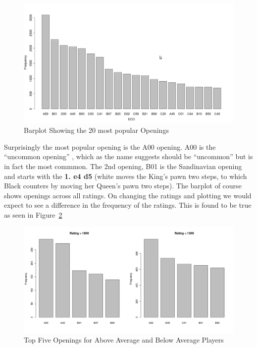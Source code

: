 \documentclass{article}
\begin{document}
\begin{figure} [htp]
\begin{center}
\includegraphics[width=5in]{eco_bar.png}
\end{center}
\caption{Barplot Showing the 20 most popular Openings}
\label{fig:ecobar}
\end{figure}

Surprisingly the most popular opening is the A00 opening. A00 is the ``uncommon opening'' , which as the name suggests should be ``uncommon'' but is in fact the most commmon. The 2nd opening, B01 is the Sandinavian opening and starts with the {\bf 1. e4 d5} (white moves the King's pawn two steps, to which Black counters by moving her Queen's pawn two steps). The barplot of course shows openings across all ratings. On changing the ratings and plotting we would expect to see a difference in the frequency of the ratings. This is found to be true as seen in Figure~\ref{fig:ecobarcomp}

\begin{figure} [htp]
\begin{center}
\includegraphics[width=5in]{eco_bar_comp.png}
\end{center}
\caption{Top Five Openings for Above Average and Below Average Players}
\label{fig:ecobarcomp}
\end{figure}
\end{document}

